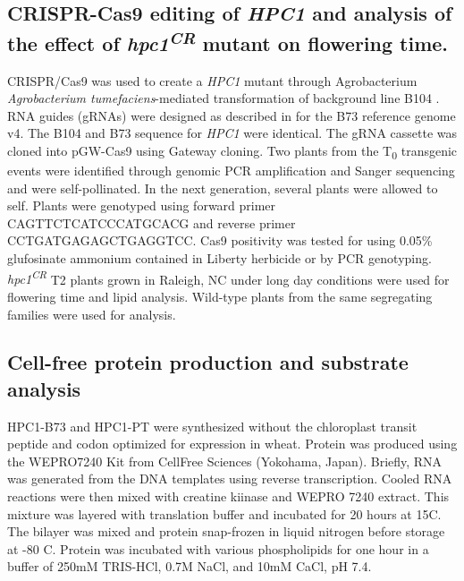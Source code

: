 \documentclass[9pt,twocolumn,twoside,lineno]{biorxiv}
\newcommand{\hpc}{\textit{HPC1}\xspace}
\begin{document}
\subsection{CRISPR-Cas9 editing of \hpc and analysis of the effect of \textit{hpc1\textsuperscript{CR}} mutant on flowering time.}
CRISPR/Cas9 was used to create a \hpc mutant through Agrobacterium \textit{Agrobacterium tumefaciens}-mediated transformation of background line B104 \cite{Wu2020-nq, Char2017-uk}. 
RNA guides (gRNAs) were designed as described in \cite{Brazelton2015-co} for the B73 reference genome v4. 
The B104 and B73 sequence for \hpc were identical. 
The gRNA cassette was cloned into pGW-Cas9 using Gateway cloning. 
Two plants from the T\textsubscript{0} transgenic events were identified through genomic PCR amplification and Sanger sequencing and were self-pollinated. 
In the next generation, several plants were allowed to self.
Plants were genotyped using forward primer CAGTTCTCATCCCATGCACG and reverse primer CCTGATGAGAGCTGAGGTCC.
Cas9 positivity was tested for using 0.05\% glufosinate ammonium contained in Liberty herbicide or by PCR genotyping. 
\textit{hpc1\textsuperscript{CR}} T2 plants grown in Raleigh, NC under long day conditions were used for flowering time and lipid analysis.
Wild-type plants from the same segregating families were used for analysis.
\subsection{Cell-free protein production and substrate analysis}
HPC1-B73 and HPC1-PT were synthesized without the chloroplast transit peptide and codon optimized for expression in wheat. 
Protein was produced using the WEPRO7240 Kit from CellFree Sciences (Yokohama, Japan).
Briefly, RNA was generated from the DNA templates using reverse transcription. 
Cooled RNA reactions were then mixed with creatine kiinase and WEPRO 7240 extract. 
This mixture was layered with translation buffer and incubated for 20 hours at 15\textdegree C.
The bilayer was mixed and protein snap-frozen in liquid nitrogen before storage at -80 \textdegree C.
Protein was incubated with various phospholipids for one hour in a buffer of 250mM TRIS-HCl, 0.7M NaCl, and 10mM CaCl, pH 7.4.
\end{document}
